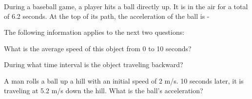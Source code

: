 \documentclass[10pt]{examdesign}
\begin{document}
\begin{multiplechoice} [title={Multiple Choice},
	rearrange=yes]
\begin{question}
	During a baseball game, a player hits a ball directly up.  It is in the air for a total of 6.2 seconds.  At the top of its path, the acceleration of the ball is - 
\end{question}

\begin{block}
The following information applies to the next two questions:




\begin{question}

What is the average speed of this object from 0 to 10 seconds?
\end{question}

\begin{question}
During what time interval is the object traveling backward?

	\end{question}

\end{block}

	\begin{question}
	A man rolls a ball up a hill with an initial speed of 2 m/s. 10 seconds later, it is traveling at 5.2 m/s down the hill.  What is the ball's acceleration?
\end{question}


\end{multiplechoice}
\end{document}
